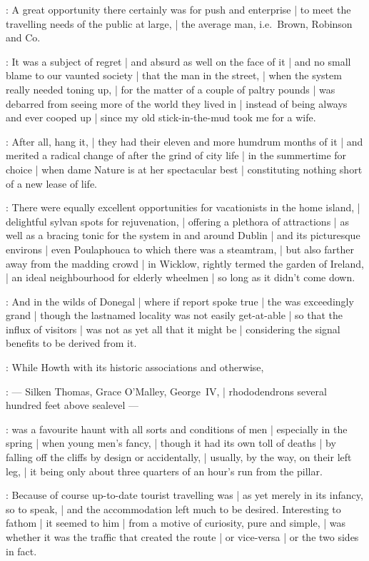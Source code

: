 :
A great opportunity there certainly was for push and enterprise |
to meet the travelling needs of the public at large, |
the average man, i.e.\ Brown, Robinson and Co.

:
It was a subject of regret |
and absurd as well on the face of it |
and no small blame to our vaunted society |
that the man in the street, |
when the system really needed toning up, |
for the matter of a couple of paltry pounds |
was debarred from seeing more of the world they lived in |
instead of being always and ever cooped up |
since my old stick-in-the-mud took me for a wife.

:
After all, hang it, |
they had their eleven and more humdrum months of it |
and merited a radical change of  after the grind of city life |
in the summertime for choice |
when dame Nature is at her spectacular best |
constituting nothing short of a new lease of life.

:
There were equally excellent opportunities for vacationists in the home island, |
delightful sylvan spots for rejuvenation, |
offering a plethora of attractions |
as well as a bracing tonic for the system in and around Dublin |
and its picturesque environs |
even Poulaphouca to which there was a steamtram, |
but also farther away from the madding crowd |
in Wicklow, rightly termed the garden of Ireland, |
an ideal neighbourhood for elderly wheelmen |
so long as it didn't come down.

:
And in the wilds of Donegal |
where if report spoke true |
the  was exceedingly grand |
though the lastnamed locality was not easily get-at-able |
so that the influx of visitors |
was not as yet all that it might be |
considering the signal benefits to be derived from it.

:
While Howth with its historic associations and otherwise,

:
    --- Silken Thomas, Grace O'Malley, George~IV, |
        rhododendrons several hundred feet above sealevel ---

:
was a favourite haunt with all sorts and conditions of men |
especially in the spring |
when young men's fancy, |
though it had its own toll of deaths |
by falling off the cliffs by design or accidentally, |
usually, by the way, on their left leg, |
it being only about three quarters of an hour's run from the pillar.

:
Because of course up-to-date tourist travelling was |
as yet merely in its infancy, so to speak, |
and the accommodation left much to be desired.
Interesting to fathom |
it seemed to him |
from a motive of curiosity, pure and simple, |
was whether it was the traffic that created the route |
or vice-versa |
or the two sides in fact.

